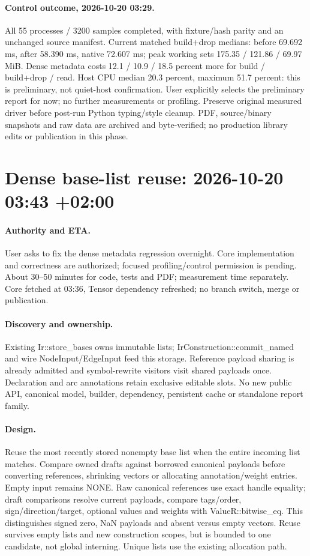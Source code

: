 \documentclass[11pt,a4paper]{article}
\begin{document}
\paragraph{Control outcome, 2026-10-20 03:29.} All 55 processes / 3200 samples completed,
with fixture/hash parity and an unchanged source manifest. Current matched build+drop
medians: before 69.692 ms, after 58.390 ms, native 72.607 ms; peak working sets
175.35 / 121.86 / 69.97 MiB. Dense metadata costs 12.1 / 10.9 / 18.5 percent more
for build / build+drop / read. Host CPU median 20.3 percent, maximum 51.7 percent:
this is preliminary, not quiet-host confirmation. User explicitly selects the preliminary
report for now; no further measurements or profiling. Preserve original measured driver
before post-run Python typing/style cleanup. PDF, source/binary snapshots and raw data
are archived and byte-verified; no production library edits or publication in this phase.


\clearpage\section*{Dense base-list reuse: 2026-10-20 03:43 +02:00}
\paragraph{Authority and ETA.} User asks to fix the dense metadata regression overnight.
Core implementation and correctness are authorized; focused profiling/control permission
is pending. About 30--50 minutes for code, tests and PDF; measurement time separately.
Core fetched at 03:36, Tensor dependency refreshed; no branch switch, merge or publication.
\paragraph{Discovery and ownership.} Existing Ir::store\_bases owns immutable lists;
IrConstruction::commit\_named and wire NodeInput/EdgeInput feed this storage. Reference
payload sharing is already admitted and symbol-rewrite visitors visit shared payloads once.
Declaration and arc annotations retain exclusive editable slots. No new public API,
canonical model, builder, dependency, persistent cache or standalone report family.
\paragraph{Design.} Reuse the most recently stored nonempty base list when the entire
incoming list matches. Compare owned drafts against borrowed canonical payloads before
converting references, shrinking vectors or allocating annotation/weight entries. Empty
input remains NONE. Raw canonical references use exact handle equality; draft comparisons
resolve current payloads, compare tags/order, sign/direction/target, optional values and
weights with ValueR::bitwise\_eq. This distinguishes signed zero, NaN payloads and absent
versus empty vectors. Reuse survives empty lists and new construction scopes, but is bounded
to one candidate, not global interning. Unique lists use the existing allocation path.
\end{document}

